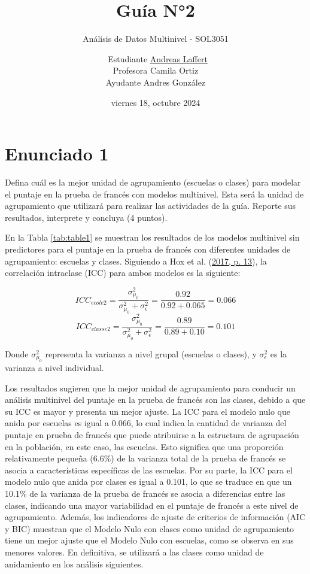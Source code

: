 \documentclass[
  12pt,
  a4paper,
]{article}
\title{\vspace{5cm} Guía N°2}
\subtitle{Análisis de Datos Multinivel - SOL3051}
\author{~Estudiante \href{mailto:alaffertt@estudiante.uc.cl}{Andreas Laffert}\\
\hspace*{0.333em}Profesora Camila Ortiz\\
Ayudante Andres González\\
\vspace{8cm}}
\date{viernes 18, octubre 2024}
\begin{document}
\maketitle

\pagebreak

\hypertarget{enunciado-1}{%
\section{Enunciado 1}\label{enunciado-1}}

Defina cuál es la mejor unidad de agrupamiento (escuelas o clases) para modelar el puntaje en la prueba de francés con modelos multinivel. Esta será la unidad de agrupamiento que utilizará para realizar las actividades de la guía. Reporte sus resultados, interprete y concluya (4 puntos).

En la Tabla \ref{tab:table1} se muestran los resultados de los modelos multinivel sin predictores para el puntaje en la prueba de francés con diferentes unidades de agrupamiento: escuelas y clases. Siguiendo a Hox et al. (\protect\hyperlink{ref-hox_multilevel_2017a}{2017, p. 13}), la correlación intraclase (ICC) para ambos modelos es la siguiente:

\[ICC_{ecole2} = \frac{\sigma^2_{\mu_0}}{\sigma^2_{\mu_0} + \sigma^2_{\epsilon}} = \frac{0.92}{0.92+0.065} = 0.066\]
\[ICC_{classe2} = \frac{\sigma^2_{\mu_0}}{\sigma^2_{\mu_0} + \sigma^2_{\epsilon}} = \frac{0.89}{0.89+ 0.10} = 0.101\]

Donde \(\sigma^2_{\mu_0}\) representa la varianza a nivel grupal (escuelas o clases), y \(\sigma^2_{\epsilon}\) es la varianza a nivel individual.

Los resultados sugieren que la mejor unidad de agrupamiento para conducir un análisis multinivel del puntaje en la prueba de francés son las clases, debido a que su ICC es mayor y presenta un mejor ajuste. La ICC para el modelo nulo que anida por escuelas es igual a 0.066, lo cual indica la cantidad de varianza del puntaje en prueba de francés que puede atribuirse a la estructura de agrupación en la población, en este caso, las escuelas. Esto significa que una proporción relativamente pequeña (6.6\%) de la varianza total de la prueba de francés se asocia a características específicas de las escuelas. Por su parte, la ICC para el modelo nulo que anida por clases es igual a 0.101, lo que se traduce en que un 10.1\% de la varianza de la prueba de francés se asocia a diferencias entre las clases, indicando una mayor variabilidad en el puntaje de francés a este nivel de agrupamiento. Además, los indicadores de ajuste de criterios de información (AIC y BIC) muestran que el Modelo Nulo con clases como unidad de agrupamiento tiene un mejor ajuste que el Modelo Nulo con escuelas, como se observa en sus menores valores. En definitiva, se utilizará a las clases como unidad de anidamiento en los análisis siguientes.
\end{document}
